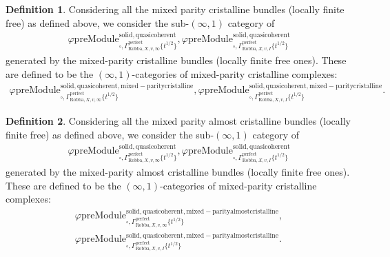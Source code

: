 \documentclass[12pt]{book}
\theoremstyle{definition}
\newtheorem{definition}{Definition}
\begin{document}
\begin{definition}
Considering all the mixed parity cristalline bundles (locally finite free) as defined above, we consider the sub-$(\infty,1)$ category of 
\begin{align}
\varphi\mathrm{preModule}^\mathrm{solid,quasicoherent}_{\square,\Gamma^\mathrm{perfect}_{\text{Robba},X,v,\infty}\{t^{1/2}\}},
\varphi\mathrm{preModule}^\mathrm{solid,quasicoherent}_{\square,\Gamma^\mathrm{perfect}_{\text{Robba},X,v,I}\{t^{1/2}\}} 
\end{align}
generated by the mixed-parity cristalline bundles (locally finite free ones). These are defined to be the $(\infty,1)$-categories of mixed-parity cristalline complexes:
\begin{align}
\varphi\mathrm{preModule}^\mathrm{solid,quasicoherent,mixed-paritycristalline}_{\square,\Gamma^\mathrm{perfect}_{\text{Robba},X,v,\infty}\{t^{1/2}\}},
\varphi\mathrm{preModule}^\mathrm{solid,quasicoherent,mixed-paritycristalline}_{\square,\Gamma^\mathrm{perfect}_{\text{Robba},X,v,I}\{t^{1/2}\}}. 
\end{align}
\end{definition}


\begin{definition}
Considering all the mixed parity almost cristalline bundles (locally finite free) as defined above, we consider the sub-$(\infty,1)$ category of 
\begin{align}
\varphi\mathrm{preModule}^\mathrm{solid,quasicoherent}_{\square,\Gamma^\mathrm{perfect}_{\text{Robba},X,v,\infty}\{t^{1/2}\}},
\varphi\mathrm{preModule}^\mathrm{solid,quasicoherent}_{\square,\Gamma^\mathrm{perfect}_{\text{Robba},X,v,I}\{t^{1/2}\}} 
\end{align}
generated by the mixed-parity almost cristalline bundles (locally finite free ones). These are defined to be the $(\infty,1)$-categories of mixed-parity cristalline complexes:
\begin{align}
\varphi\mathrm{preModule}^\mathrm{solid,quasicoherent,mixed-parityalmostcristalline}_{\square,\Gamma^\mathrm{perfect}_{\text{Robba},X,v,\infty}\{t^{1/2}\}},\\
\varphi\mathrm{preModule}^\mathrm{solid,quasicoherent,mixed-parityalmostcristalline}_{\square,\Gamma^\mathrm{perfect}_{\text{Robba},X,v,I}\{t^{1/2}\}}. 
\end{align}
\end{definition}
\end{document}
